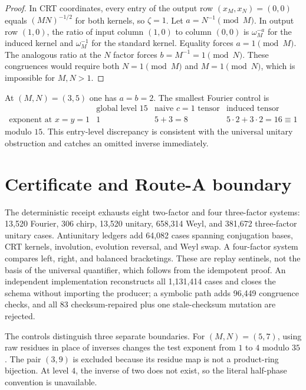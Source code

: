 \documentclass[11pt]{article}
\begin{document}
\begin{proof}
In CRT coordinates, every entry of the output row $(x_M,x_N)=(0,0)$ equals
$(MN)^{-1/2}$ for both kernels, so $\zeta=1$.  Let
$a=N^{-1}\pmod M$.  In output row $(1,0)$, the ratio of input column $(1,0)$
to column $(0,0)$ is $\omega_M^{-a}$ for the induced kernel and
$\omega_M^{-1}$ for the standard kernel.  Equality forces $a=1\pmod M$.
The analogous ratio at the $N$ factor forces $b=M^{-1}=1\pmod N$.  These
congruences would require both $N=1\pmod M$ and $M=1\pmod N$, which is
impossible for $M,N>1$.
\end{proof}

At $(M,N)=(3,5)$ one has $a=b=2$.  The smallest Fourier control is
\[
\begin{array}{c|ccc}
&\text{global level }15&\text{naive }c=1\text{ tensor}&\text{induced tensor}\\\hline
\text{exponent at }x=y=1&1&5+3=8&5\cdot2+3\cdot2=16\equiv1
\end{array}
\]
modulo $15$.  This entry-level discrepancy is consistent with the universal
unitary obstruction and catches an omitted inverse immediately.

\section{Certificate and Route-A boundary}

The deterministic receipt exhausts eight two-factor and four three-factor
systems: 13,520 Fourier, 306 chirp, 13,520 unitary, 658,314 Weyl, and 381,672
three-factor unitary cases.  Antiunitary ledgers add 64,082 cases spanning
conjugation bases, CRT kernels, involution, evolution reversal, and Weyl swap.
A four-factor system compares left, right, and balanced bracketings.  These are
replay sentinels, not the basis of the universal quantifier, which follows from
the idempotent proof.  An independent implementation reconstructs all
1,131,414 cases and closes the schema without importing the producer; a
symbolic path adds 96,449 congruence checks, and all 83 checksum-repaired plus
one stale-checksum mutation are rejected.

The controls distinguish three separate boundaries.  For $(M,N)=(5,7)$,
using raw residues in place of inverses changes the test exponent from $1$ to
$4$ modulo $35$.  The pair $(3,9)$ is excluded because its residue map is not
a product-ring bijection.  At level $4$, the inverse of two does not exist, so
the literal half-phase convention is unavailable.
\end{document}
